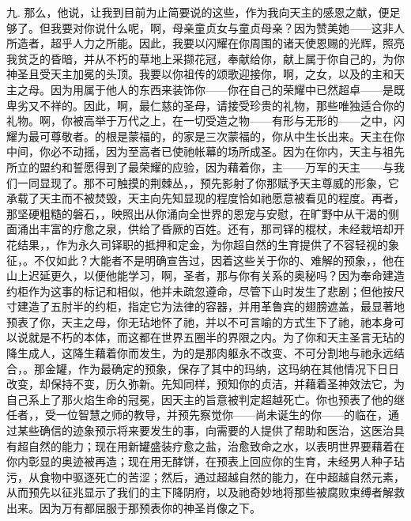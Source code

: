 九. 那么，他说，让我到目前为止简要说的这些，作为我向天主的感恩之献，便足够了。但我要对你说什么呢，啊，母亲童贞女与童贞母亲？因为赞美她——这非人所造者，超乎人力之所能。因此，我要以闪耀在你周围的诸天使恩赐的光辉，照亮我贫乏的昏暗，并从不朽的草地上采撷花冠，奉献给你，献上属于你自己的，为你神圣且受天主加冕的头顶。我要以你祖传的颂歌迎接你，啊，之女，以及的主和天主之母。因为用属于他人的东西来装饰你——你在自己的荣耀中已然超卓——是既卑劣又不祥的。因此，啊，最仁慈的圣母，请接受珍贵的礼物，那些唯独适合你的礼物。啊，你被高举于万代之上，在一切受造之物——有形与无形的——之中，闪耀为最可尊敬者。的根是蒙福的，的家是三次蒙福的，你从中生长出来。天主在你中间，你必不动摇，因为至高者已使祂帐幕的场所成圣。因为在你内，天主与祖先所立的盟约和誓愿得到了最荣耀的应验，因为藉着你，主——万军的天主——与我们一同显现了。那不可触摸的荆棘丛，，预先影射了你那赋予天主尊威的形象，它承载了天主而不被焚毁，天主向先知显现的程度恰如祂愿意被看见的程度。再者，那坚硬粗糙的磐石，，映照出从你涌向全世界的恩宠与安慰，在旷野中从干渴的侧面涌出丰富的疗愈之泉，供给了昏厥的百姓。还有，那司铎的棍杖，未经栽培却开花结果，，作为永久司铎职的抵押和定金，为你超自然的生育提供了不容轻视的象征，。不仅如此？大能者不是明确宣告过，因着这些关于你的、难解的预象，，他在山上迟延更久，以便他能学习，啊，圣者，那与你有关系的奥秘吗？因为奉命建造约柜作为这事的标记和相似，他并未疏忽遵命，尽管下山时发生了悲剧；但他按尺寸建造了五肘半的约柜，指定它为法律的容器，并用革鲁宾的翅膀遮盖，最显著地预表了你，天主之母，你无玷地怀了祂，并以不可言喻的方式生下了祂，祂本身可以说就是不朽的本体，而这都在世界五圈半的界限之内。为了你和天主圣言无玷的降生成人，这降生藉着你而发生，为的是那肉躯永不改变、不可分割地与祂永远结合，。那金罐，作为最确定的预象，保存了其中的玛纳，这玛纳在其他情况下日日改变，却保持不变，历久弥新。先知同样，预知你的贞洁，并藉着圣神效法它，为自己系上了那火焰生命的冠冕，因天主的旨意被判定超越死亡。你也预表了他的继任者，，受一位智慧之师的教导，并预先察觉你——尚未诞生的你——的临在，通过某些确信的迹象预示将来要发生的事，向需要的人提供了帮助和医治，这医治具有超自然的能力；现在用新罐盛装疗愈之盐，治愈致命之水，以表明世界要藉着在你内彰显的奥迹被再造；现在用无酵饼，在预表上回应你的生育，未经男人种子玷污，从食物中驱逐死亡的苦涩；然后，通过超越自然的能力，在中超越自然元素，从而预先以征兆显示了我们的主下降阴府，以及祂奇妙地将那些被腐败束缚者解救出来。因为万有都屈服于那预表你的神圣肖像之下。\par

